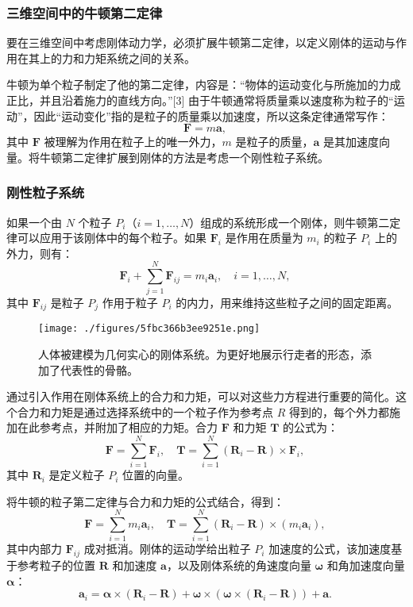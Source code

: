 \subsubsection{三维空间中的牛顿第二定律}  
要在三维空间中考虑刚体动力学，必须扩展牛顿第二定律，以定义刚体的运动与作用在其上的力和力矩系统之间的关系。

牛顿为单个粒子制定了他的第二定律，内容是：“物体的运动变化与所施加的力成正比，并且沿着施力的直线方向。”[3] 由于牛顿通常将质量乘以速度称为粒子的“运动”，因此“运动变化”指的是粒子的质量乘以加速度，所以这条定律通常写作：
\[
\mathbf{F} = m \mathbf{a},~
\]
其中 \( \mathbf{F} \) 被理解为作用在粒子上的唯一外力，\( m \) 是粒子的质量，\( \mathbf{a} \) 是其加速度向量。将牛顿第二定律扩展到刚体的方法是考虑一个刚性粒子系统。
\subsubsection{刚性粒子系统} 
如果一个由 \( N \) 个粒子 \( P_i \)（\( i=1, \dots, N \)）组成的系统形成一个刚体，则牛顿第二定律可以应用于该刚体中的每个粒子。如果 \( \mathbf{F}_i \) 是作用在质量为 \( m_i \) 的粒子 \( P_i \) 上的外力，则有：
\[
\mathbf{F}_i + \sum_{j=1}^{N} \mathbf{F}_{ij} = m_i \mathbf{a}_i, \quad i = 1, \dots, N,~
\]
其中 \( \mathbf{F}_{ij} \) 是粒子 \( P_j \) 作用于粒子 \( P_i \) 的内力，用来维持这些粒子之间的固定距离。
\begin{figure}[ht]
\centering
\texttt{[image: ./figures/5fbc366b3ee9251e.png]}
\caption{人体被建模为几何实心的刚体系统。为更好地展示行走者的形态，添加了代表性的骨骼。} \label{fig_GTDL_5}
\end{figure}
通过引入作用在刚体系统上的合力和力矩，可以对这些力方程进行重要的简化。这个合力和力矩是通过选择系统中的一个粒子作为参考点 \( R \) 得到的，每个外力都施加在此参考点，并附加了相应的力矩。合力 \( \mathbf{F} \) 和力矩 \( \mathbf{T} \) 的公式为：
\[
\mathbf{F} = \sum_{i=1}^{N} \mathbf{F}_{i}, \quad \mathbf{T} = \sum_{i=1}^{N} (\mathbf{R}_{i} - \mathbf{R}) \times \mathbf{F}_{i},~
\]
其中 \( \mathbf{R}_i \) 是定义粒子 \( P_i \) 位置的向量。

将牛顿的粒子第二定律与合力和力矩的公式结合，得到：
\[
\mathbf{F} = \sum_{i=1}^{N} m_{i} \mathbf{a}_{i}, \quad \mathbf{T} = \sum_{i=1}^{N} (\mathbf{R}_{i} - \mathbf{R}) \times (m_{i} \mathbf{a}_{i}),~
\]
其中内部力 \( \mathbf{F}_{ij} \) 成对抵消。刚体的运动学给出粒子 \( P_i \) 加速度的公式，该加速度基于参考粒子的位置 \( \mathbf{R} \) 和加速度 \( \mathbf{a} \)，以及刚体系统的角速度向量 \( \boldsymbol{\omega} \) 和角加速度向量 \( \boldsymbol{\alpha} \)：
\[
\mathbf{a}_{i} = \boldsymbol{\alpha} \times (\mathbf{R}_{i} - \mathbf{R}) + \boldsymbol{\omega} \times (\boldsymbol{\omega} \times (\mathbf{R}_{i} - \mathbf{R})) + \mathbf{a}.~
\]
